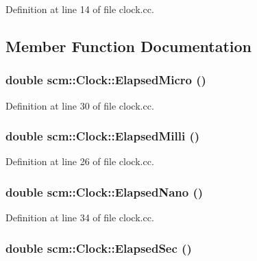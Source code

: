 Definition at line 14 of file clock.cc.



\subsection{Member Function Documentation}
\hypertarget{classscm_1_1_clock_a4aa1a9c3a67a29ea36df1d96c4e704a8}{
\subsubsection[{ElapsedMicro}]{\setlength{\rightskip}{0pt plus 5cm}double scm::Clock::ElapsedMicro ()}}
\label{classscm_1_1_clock_a4aa1a9c3a67a29ea36df1d96c4e704a8}


Definition at line 30 of file clock.cc.

\hypertarget{classscm_1_1_clock_a84f0eb2cc75d6354da139aaf23affe84}{
\subsubsection[{ElapsedMilli}]{\setlength{\rightskip}{0pt plus 5cm}double scm::Clock::ElapsedMilli ()}}
\label{classscm_1_1_clock_a84f0eb2cc75d6354da139aaf23affe84}


Definition at line 26 of file clock.cc.

\hypertarget{classscm_1_1_clock_a088b92be330ad4be554ad0af3f60423d}{
\subsubsection[{ElapsedNano}]{\setlength{\rightskip}{0pt plus 5cm}double scm::Clock::ElapsedNano ()}}
\label{classscm_1_1_clock_a088b92be330ad4be554ad0af3f60423d}


Definition at line 34 of file clock.cc.

\hypertarget{classscm_1_1_clock_a69a85c72b329ac5840f0dcea13167c70}{
\subsubsection[{ElapsedSec}]{\setlength{\rightskip}{0pt plus 5cm}double scm::Clock::ElapsedSec ()}}
\label{classscm_1_1_clock_a69a85c72b329ac5840f0dcea13167c70}


